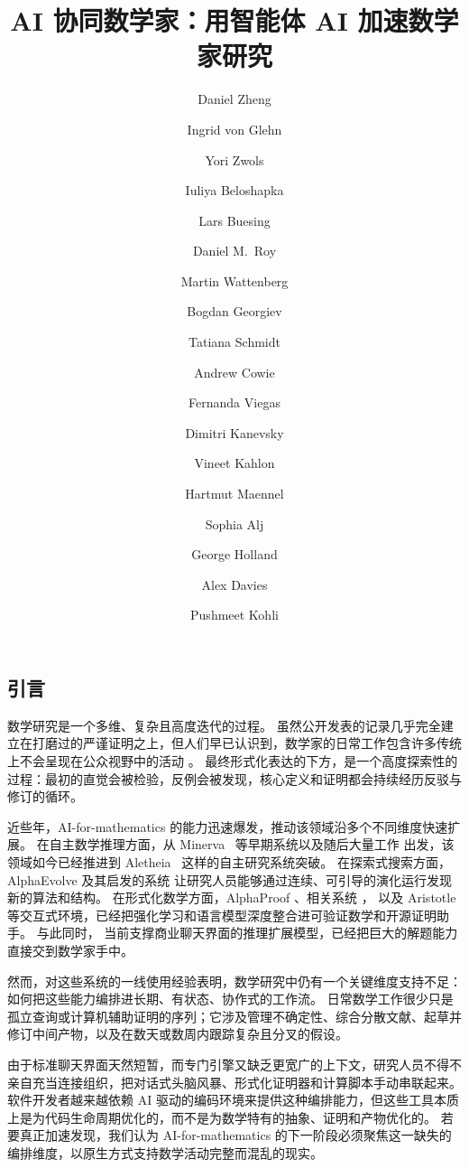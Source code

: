 \documentclass[11pt, a4paper, copyright, gdm]{google}
\title{{AI 协同数学家：用智能体 AI 加速数学家研究}}
\author[1]{Daniel Zheng}
\author[1]{Ingrid von Glehn}
\author[1]{Yori Zwols}
\author[1]{Iuliya Beloshapka}
\author[1]{Lars Buesing}
\author[1]{Daniel M.~Roy}
\author[1]{Martin Wattenberg}
\author[1]{Bogdan Georgiev}
\author[1]{Tatiana Schmidt}
\author[1]{Andrew Cowie}
\author[1]{Fernanda Viegas}
\author[1]{Dimitri Kanevsky}
\author[2]{Vineet Kahlon}
\author[1]{Hartmut Maennel}
\author[1]{Sophia Alj}
\author[1]{George Holland}
\author[1]{Alex Davies}
\author[1]{Pushmeet Kohli}
\affil[1]{\thepa{}{}}
\affil[2]{Google}
\begin{document}
\begin{CJK*}{UTF8}{gbsn}

\maketitle

\section{引言}

数学研究是一个多维、复杂且高度迭代的过程。
虽然公开发表的记录几乎完全建立在打磨过的严谨证明之上，但人们早已认识到，数学家的日常工作包含许多传统上不会呈现在公众视野中的活动 \citep{polya1954, lakatos1976, epstein1992}。
最终形式化表达的下方，是一个高度探索性的过程：最初的直觉会被检验，反例会被发现，核心定义和证明都会持续经历反驳与修订的循环。

近些年，AI-for-mathematics 的能力迅速爆发，推动该领域沿多个不同维度快速扩展。
在自主数学推理方面，从 Minerva~\citep{lewkowycz2022minerva} 等早期系统以及随后大量工作
\citep{taylor2022galactica,azerbayev2023llemma,yue2023mammoth,shao2024deepseekmath,mistral2024mathstral,yang2024qwen25math,lu2024aiscientist,deepthink2025,he2025skywork,yamada2025aiscientistv2,liu2025deepevolve,zimmer2026agentic} 出发，该领域如今已经推进到 Aletheia~\citep{feng2026} 这样的自主研究系统突破。
在探索式搜索方面，AlphaEvolve \citep{romeraparedes2024, novikov2025} 及其启发的系统 \citep{cemri2026adaevolve,sharma2025openevolve,lange2025shinkaevolve} 让研究人员能够通过连续、可引导的演化运行发现新的算法和结构。
在形式化数学方面，AlphaProof \citep{hubert2025}、相关系统 \citep{song2024leancopilot, wang2024legoprover, ren2025deepseekproverv2, lin2025goedelproverv2, li2025lips, chen2025seedprover, wang2025kimina, hariharan2026milestoneformalizationspherepacking, li2024hunyuanprover, jana2025proofbridge, chen2026parity, liu2026numina, deltredici2025axprover}，
以及 Aristotle \citep{harmonic2025aristotle} 等交互式环境，已经把强化学习和语言模型深度整合进可验证数学和开源证明助手。
%
与此同时，
%
当前支撑商业聊天界面的推理扩展模型，已经把巨大的解题能力直接交到数学家手中。

然而，对这些系统的一线使用经验表明，数学研究中仍有一个关键维度支持不足：如何把这些能力编排进长期、有状态、协作式的工作流。
日常数学工作很少只是孤立查询或计算机辅助证明的序列；它涉及管理不确定性、综合分散文献、起草并修订中间产物，以及在数天或数周内跟踪复杂且分叉的假设。

由于标准聊天界面天然短暂，而专门引擎又缺乏更宽广的上下文，研究人员不得不亲自充当连接组织，把对话式头脑风暴、形式化证明器和计算脚本手动串联起来。
软件开发者越来越依赖 AI 驱动的编码环境来提供这种编排能力，但这些工具本质上是为代码生命周期优化的，而不是为数学特有的抽象、证明和产物优化的。
若要真正加速发现，我们认为 AI-for-mathematics 的下一阶段必须聚焦这一缺失的编排维度，以原生方式支持数学活动完整而混乱的现实。


\end{CJK*}
\end{document}

